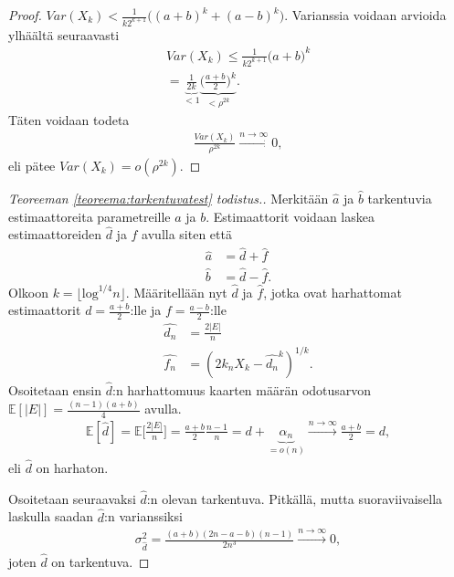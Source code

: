 \documentclass[finnish,12pt,a4paper,pdftex,sci,utf8]{aaltothesis}
\newcommand\floor[1]{\lfloor#1\rfloor}
\begin{document}
\begin{proof}
	 $Var(X_k) < \frac{1}{k2^{k+1}} \big((a+b)^k + (a-b)^k \big)$. Varianssia voidaan arvioida ylhäältä seuraavasti
	\begin{align*}
		Var(X_k) \leq \frac{1}{k2^{k+1}} \big(a+b \big)^k \\
		= \underbrace{\frac{1}{2k}}_{< 1} \underbrace{\big(\frac{a+b}{2}\big)^k}_{< \rho^{2k}}.
	\end{align*}
	Täten voidaan todeta 
	\begin{align*}
		\frac{Var(X_k)}{\rho^{2k}} \xrightarrow[]{n \rightarrow \infty} 0,
	\end{align*}
	eli pätee $Var(X_k) = o(\rho^{2k})$.
\end{proof}

\begin{proof}[Teoreeman \ref{teoreema:tarkentuvatest} todistus.]
	Merkitään $\hat{a}$ ja $\hat{b}$ tarkentuvia estimaattoreita parametreille $a$ ja $b$. Estimaattorit voidaan laskea estimaattoreiden $\hat{d}$ ja $\hat{f}$ avulla siten että 
	\begin{align*}
		\hat{a} &= \hat{d} + \hat{f} \\
		\hat{b} &= \hat{d} - \hat{f}.
	\end{align*}
	Olkoon $k = \floor{\text{log}^{1/4}n}$. Määritellään nyt $\hat{d}$ ja $\hat{f}$, jotka ovat harhattomat estimaattorit $d = \frac{a+b}{2}$:lle ja $f = \frac{a-b}{2}$:lle
	\begin{align*}
		\hat{d_n} &= \frac{2\left|E\right|}{n} \\
		\hat{f_n} &= (2 k_n X_k - \hat{d_n}^{k})^{1/k}.
	\end{align*}
	Osoitetaan ensin $\hat{d}$:n harhattomuus kaarten määrän odotusarvon $\mathbb{E}[|E|] = \frac{(n-1)(a+b)}{4}$ avulla.
	\begin{align*}
		\mathbb{E}[\hat{d}] = \mathbb{E}\bigg[ \frac{2|E|}{n} \bigg] = \frac{a+b}{2}\frac{n-1}{n} = d + \underbrace{\alpha_n}_{= o(n)} \xrightarrow{n \rightarrow \infty}\frac{a+b}{2} = d,
	\end{align*}
	eli $\hat{d}$ on harhaton.

	Osoitetaan seuraavaksi $\hat{d}$:n olevan tarkentuva. Pitkällä, mutta suoraviivaisella laskulla saadan $\hat{d}$:n varianssiksi 
	\begin{align*}
		\sigma_{\hat{d}}^2 = \frac{(a+b)(2n-a-b)(n-1)}{2n^3} \xrightarrow{n \rightarrow \infty} 0,
	\end{align*}
	joten $\hat{d}$ on tarkentuva.


\end{proof}
\end{document}
